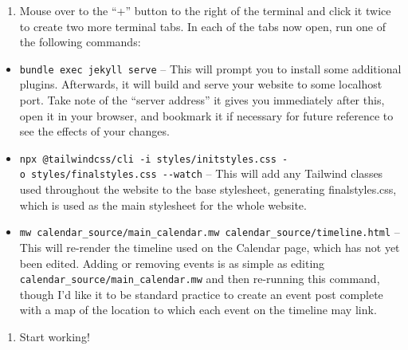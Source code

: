 \documentclass[
]{book}
\providecommand{\tightlist}{%
  \setlength{\itemsep}{0pt}\setlength{\parskip}{0pt}}
\begin{document}
\begin{enumerate}
\def\labelenumi{\arabic{enumi}.}
\setcounter{enumi}{7}
\tightlist
\item
  Mouse over to the ``+'' button to the right of the terminal and click it twice to create two more terminal tabs. In each of the tabs now open, run one of the following commands:
\end{enumerate}

\begin{itemize}
\tightlist
\item
  \texttt{bundle\ exec\ jekyll\ serve} -- This will prompt you to install some additional plugins. Afterwards, it will build and serve your website to some localhost port. Take note of the ``server address'' it gives you immediately after this, open it in your browser, and bookmark it if necessary for future reference to see the effects of your changes.
\item
  \texttt{npx\ @tailwindcss/cli\ -i\ styles/initstyles.css\ -o\ styles/finalstyles.css\ -\/-watch} -- This will add any Tailwind classes used throughout the website to the base stylesheet, generating finalstyles.css, which is used as the main stylesheet for the whole website.
\item
  \texttt{mw\ calendar\_source/main\_calendar.mw\ calendar\_source/timeline.html} -- This will re-render the timeline used on the Calendar page, which has not yet been edited. Adding or removing events is as simple as editing \texttt{calendar\_source/main\_calendar.mw} and then re-running this command, though I'd like it to be standard practice to create an event post complete with a map of the location to which each event on the timeline may link.
\end{itemize}

\begin{enumerate}
\def\labelenumi{\arabic{enumi}.}
\setcounter{enumi}{8}
\tightlist
\item
  Start working!
\end{enumerate}


\end{document}
